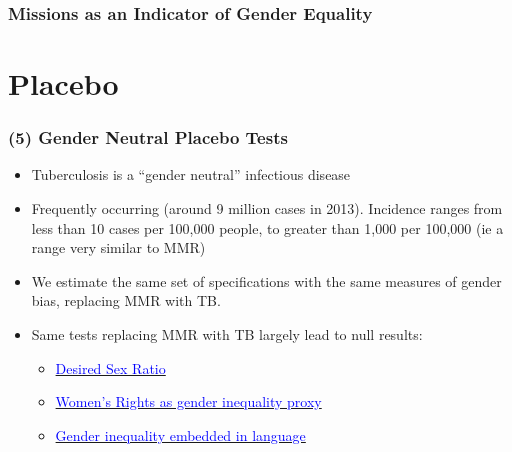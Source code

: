 \documentclass[10pt,letterpaper,subeqn]{beamer}
\begin{document}
\begin{frame}[label=MissionsTab]
\frametitle{Missions as an Indicator of Gender Equality}

\vspace{1cm}
\end{frame}

\section{Placebo}



\begin{frame}[label=placebos]
\frametitle{(5) Gender Neutral Placebo Tests}
\begin{itemize}
\setlength{\itemsep}{15pt}
  \item Tuberculosis is a ``gender neutral'' infectious disease
  \item Frequently occurring (around 9 million cases in 2013). Incidence ranges
        from less than 10 cases per 100,000 people, to greater than 1,000 per
        100,000 (ie a range very similar to MMR)
  \item We estimate the same set of specifications with the same measures of
        gender bias, replacing MMR with TB.
  \item Same tests replacing MMR with TB largely lead to null results:
  \begin{itemize}
    \item \hyperlink{placebo2}{\textcolor{blue}{Desired Sex Ratio}}
    \item \hyperlink{placebo1}{\textcolor{blue}{Women's Rights as gender
                                                inequality proxy}}
    \item \hyperlink{placebo3}{\textcolor{blue}{Gender inequality embedded in
                                                language}}
  \end{itemize}
\end{itemize}
\end{frame}


\end{document}

